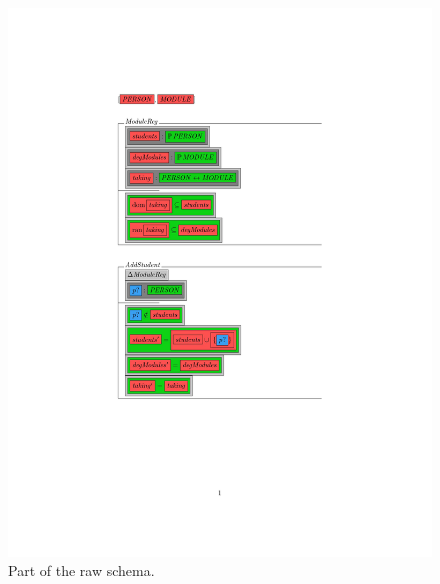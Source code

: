 \begin{figure}[H]
\begin{minipage}{0.45\textwidth}
\begin{tiny}
\begin{BVerbatim}[commandchars=+\[\]]
\end{BVerbatim}
\end{tiny}
\caption{Part of the raw schema.\label{fig:zcgaschema}}
\end{minipage}\hfill
\begin{minipage}{0.45\textwidth}
\centering
\centering
\includegraphics[scale=0.7, clip, trim=5.5cm 8cm 9.5cm 4cm, width=1.00\textwidth]{Figures/fullexample/1.jpg}

\end{minipage}
\end{figure}
